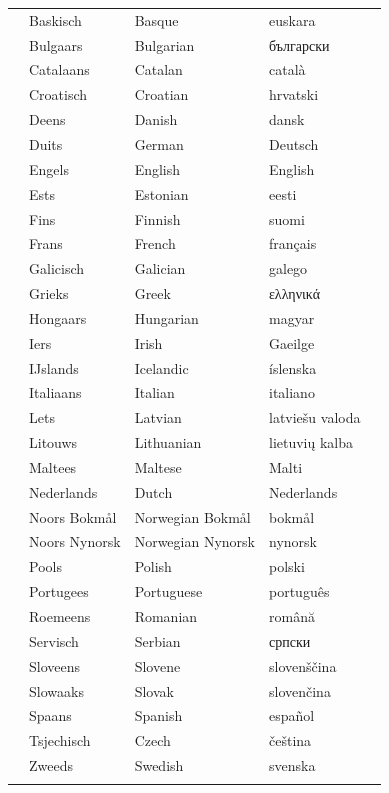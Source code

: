 \documentclass[]{../../metanetpaper}
\begin{document}
\cleardoublepage

\label{whitepaperseries}

\vspace*{-5mm}
\centering
  \setlength{\tabcolsep}{2em}
  \begin{tabularx}{\textwidth}{lllll} \toprule\addlinespace
  &Baskisch & Basque & euskara& \\
  &Bulgaars & Bulgarian & български& \\
  &Catalaans & Catalan & català& \\
  &Croatisch & Croatian & hrvatski& \\
&Deens & Danish & dansk& \\
  &Duits & German & Deutsch& \\
  &Engels & English & English& \\
  &Ests & Estonian & eesti& \\
  &Fins & Finnish & suomi& \\
  &Frans & French & français& \\
  &Galicisch & Galician & galego& \\
  &Grieks & Greek & ελληνικά& \\
  &Hongaars & Hungarian & magyar& \\
  &Iers & Irish & Gaeilge& \\
  &IJslands & Icelandic & íslenska& \\
  &Italiaans & Italian & italiano& \\
  &Lets & Latvian & latviešu valoda& \\
  &Litouws & Lithuanian & lietuvių kalba& \\
  &Maltees & Maltese & Malti& \\
  &Nederlands & Dutch & Nederlands& \\
  &Noors Bokmål & Norwegian Bokmål & bokmål& \\
  &Noors Nynorsk & Norwegian Nynorsk & nynorsk& \\
  &Pools & Polish & polski& \\
  &Portugees & Portuguese & português& \\
  &Roemeens & Romanian & română& \\
  &Servisch & Serbian & српски& \\
  &Sloveens & Slovene & slovenščina& \\
  &Slowaaks & Slovak & slovenčina& \\
  &Spaans & Spanish & español& \\
  &Tsjechisch & Czech & čeština& \\
  &Zweeds & Swedish & svenska& \\
\addlinespace \bottomrule
\end{tabularx}
\end{document}
